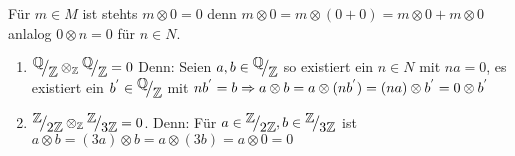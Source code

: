 \begin{anm}
	Für $m \in M $ ist stehts $m \otimes 0 =0 $ denn  $ m \otimes 0 = m \otimes (0+0) = m \otimes 0 + m \otimes 0 $ anlalog $ 0 \otimes n = 0 $ für $n \in N$. 
\end{anm}
\begin{bsp}
	\begin{enumerate}
		\item $\QR{\Q}{\Z} \otimes_{\Z} \QR{\Q}{\Z} = 0 $ Denn: Seien $a,b \in \QR{\Q}{\Z}$ so existiert ein $ n \in N $ mit $ na = 0 $, es existiert ein $b^{'} \in \QR{\Q}{\Z} $ mit $nb^{'} = b \Rightarrow a \otimes b = a \otimes (nb^{'}) = (na) \otimes b^{'} = 0 \otimes b^{'}$
		\item $\QR{\Z}{2\Z} \otimes_{\Z} \QR{\Z}{3\Z} = 0 $. Denn: Für $a \in \QR{\Z}{2\Z}, b \in \QR{\Z}{3\Z} $ ist $a \otimes b = (3a) \otimes b = a \otimes (3b) = a \otimes 0 = 0$
	\end{enumerate}
\end{bsp}